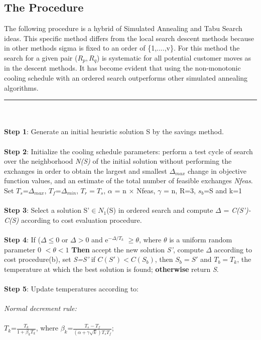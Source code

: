 \documentclass[11pt]{article}
\newcommand{\<}{\langle}
\renewcommand{\>}{\rangle}
\theoremstyle{definition}
\begin{document}
    \subsection{The Procedure}
    The following procedure is a hybrid of Simulated Annealing and Tabu Search ideas. This specific method differs from the local search descent methods because in other methods sigma is fixed to an order of \{1,....,v\}. For this method the search for a given pair ($R_{p}, R_{q}$) is systematic for all potential customer moves as in the descent methods. It has become evident that using the non-monotonic cooling schedule with an ordered search outperforms other simulated annealing algorithms.\\
    \noindent\rule{17cm}{0.4pt}\\
    \\\textbf{Step 1}: Generate an initial heuristic solution S by the savings method.\\
    \\\textbf{Step 2}: Initialize the cooling schedule parameters: 
    perform a test cycle of search over the neighborhood \textit{N(S)} of the initial solution without performing the exchanges in order to obtain the largest and smallest $\Delta_{max}$ change in objective function values, and an estimate of the total number of feasible exchanges \textit{Nfeas}.
    Set {$T_s$=$\Delta_{max}$, $T_f$=$\Delta_{min}$, $T_r=T_s$, $\alpha$ = n $\times$ Nfeas, $\gamma$ = n, R=3, $s_b$=S and k=1}\\
    \\\textbf{Step 3}: Select a solution S'$\in N_1$(S) in ordered search and compute $\Delta$ = \textit{C(S')-C(S)} according to cost evaluation procedure.\\
    \\\textbf{Step 4}: If {($\Delta \leq 0$ or $\Delta > 0$ and e$^{-\Delta/T_k}$ $\geq \theta$, where $\theta$ is a uniform random parameter 0 $< \theta <1$}
    \textbf{Then} accept the new solution \textit{S'}, compute $\Delta$ according to cost procedure(b), set \textit{S=S'}
        if \textit{$C(S')<C(S_b)$}, then \textit{$S_b=S'$} and \textit{$T_b = T_k$}, the temperature at which the best solution is found;
        \textbf{otherwise} return \textit{S}.\\
    \\\textbf{Step 5}: Update temperatures according to:\\ 
    \\\textit{Normal decrement rule:}\\
    \\$T_{k}$=$\frac{T_{k}}{1+\beta_{k}T_{k}}$, where $\beta_{k}$=$\frac{T_{s}-T_{f}}{(\alpha + \gamma \sqrt{k}) T_{s}T_{f}}$;\\
\end{document}
